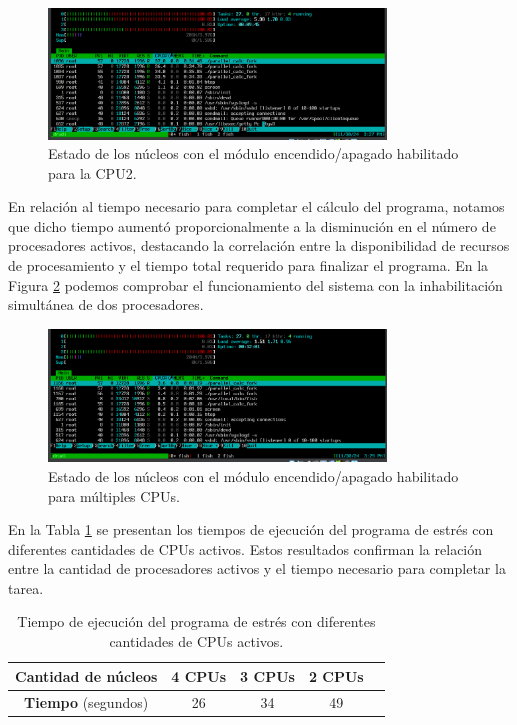 \begin{figure}[H]
    \centering
    \includegraphics[width=0.8\textwidth]{images/cpuOnOff-result-1CPU.png}
    \caption{Estado de los núcleos con el módulo encendido/apagado habilitado para la CPU2.}
    \label{fig:cpuOnOff-result-1cpu}
\end{figure}

En relación al tiempo necesario para completar el cálculo del programa, notamos que dicho tiempo aumentó proporcionalmente a la disminución en el número de procesadores activos, destacando la correlación entre la disponibilidad de recursos de procesamiento y el tiempo total requerido para finalizar el programa. En la Figura \ref{fig:cpuOnOff-result-2cpu} podemos comprobar el funcionamiento del sistema con la inhabilitación simultánea de dos procesadores.\par

\begin{figure}[H]
    \centering
    \includegraphics[width=0.8\textwidth]{images/cpuOnOff-result-2CPU.png}
    \caption{Estado de los núcleos con el módulo encendido/apagado habilitado para múltiples CPUs.}
    \label{fig:cpuOnOff-result-2cpu}
\end{figure}

En la Tabla \ref{tabla:cpuOnOff-result-times} se presentan los tiempos de ejecución del programa de estrés con diferentes cantidades de CPUs activos. Estos resultados confirman la relación entre la cantidad de procesadores activos y el tiempo necesario para completar la tarea.\par

\begin{table}[H]
    \centering
    \begin{tabular}{|c|c|c|c|c|}
        \hline
        \textbf{Cantidad de núcleos} & \textbf{4 CPUs} & \textbf{3 CPUs} & \textbf{2 CPUs} \\
        \hline
        \textbf{Tiempo} (segundos)   & 26              & 34              & 49              \\
        \hline
    \end{tabular}
    \caption{Tiempo de ejecución del programa de estrés con diferentes cantidades de CPUs activos.}
    \label{tabla:cpuOnOff-result-times}
\end{table}

